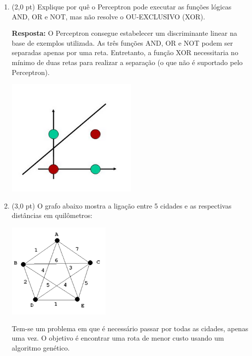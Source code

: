 \documentclass[12pt,a4paper,oneside]{article}
\begin{document}
\begin{enumerate}
	\item (2,0 pt)  Explique por quê o Perceptron pode executar as funções lógicas AND, OR e NOT, mas não resolve o OU-EXCLUSIVO (XOR).
	
	\vspace*{0.3cm}
	
	{\color{blue} {\bf Resposta:} O Perceptron consegue estabelecer um discriminante linear na base de exemplos utilizada. As três funções AND, OR e NOT podem ser separadas apenas por uma reta. Entretanto, a função XOR necessitaria no mínimo de duas retas para realizar a separação (o que não é suportado pelo Perceptron).
	\begin{center}
		\includegraphics[width=0.5\textwidth]{images/xor}
	\end{center}
	}
	
	\item (3,0 pt) O grafo abaixo mostra a ligação entre 5 cidades e as respectivas distâncias em quilômetros:
	
	\begin{center}
		\includegraphics[width=5cm]{images/fig02.png}
	\end{center}
	
	Tem-se um problema em que é necessário passar por todas as cidades, apenas uma vez. O objetivo é encontrar uma rota de menor custo usando um algoritmo genético.
	

\end{enumerate}
\end{document}
